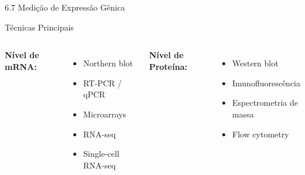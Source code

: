 \begin{frame}{6.7 Medição de Expressão Gênica}
\begin{block}{Técnicas Principais}
\begin{columns}
\textbf{Nível de mRNA:}
\begin{itemize}
    \item Northern blot
    \item RT-PCR / qPCR
    \item Microarrays
    \item RNA-seq
    \item Single-cell RNA-seq
\end{itemize}

\textbf{Nível de Proteína:}
\begin{itemize}
    \item Western blot
    \item Imunofluorescência
    \item Espectrometria de massa
    \item Flow cytometry
\end{itemize}
\end{columns}
\end{block}

\vspace{0.3cm}

\end{frame}

